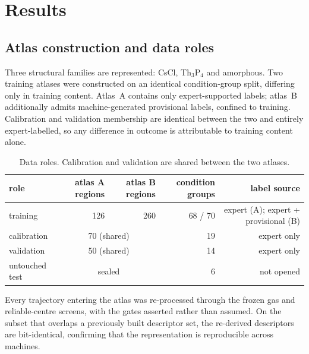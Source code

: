 \section{Results}
\label{sec:results}


\subsection{Atlas construction and data roles}
\label{sec:res-atlas}

Three structural families are represented: CsCl, Th$_3$P$_4$ and amorphous. Two training
atlases were constructed on an identical condition-group split, differing only in training
content. Atlas~A contains only expert-supported labels; atlas~B additionally admits
machine-generated provisional labels, confined to training. Calibration and validation
membership are identical between the two and entirely expert-labelled, so any difference in
outcome is attributable to training content alone.

\begin{table}[htbp]
  \centering\small
  \caption{Data roles. Calibration and validation are shared between the two atlases.}
  \label{tab:splits}
  \begin{tabular}{lrrrr}
    \toprule
    role & atlas A regions & atlas B regions & condition groups & label source \\
    \midrule
    training    & 126 & 260 & 68 / 70 & expert (A); expert + provisional (B) \\
    calibration & \multicolumn{2}{c}{70 (shared)} & 19 & expert only \\
    validation  & \multicolumn{2}{c}{50 (shared)} & 14 & expert only \\
    untouched test & \multicolumn{2}{c}{sealed} & 6 & not opened \\
    \bottomrule
  \end{tabular}
\end{table}

Every trajectory entering the atlas was re-processed through the frozen gas and
reliable-centre screens, with the gates asserted rather than assumed. On the subset that
overlaps a previously built descriptor set, the re-derived descriptors are bit-identical,
confirming that the representation is reproducible across machines.

